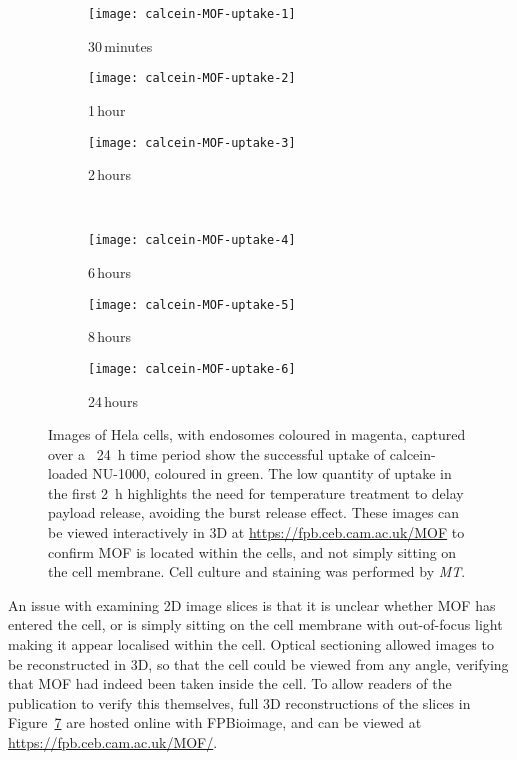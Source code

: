 \begin{figure}[tbp]
\centering
\begin{subfigure}[b]{0.325\textwidth}
	\texttt{[image: calcein-MOF-uptake-1]}
	\caption{30\,minutes}\label{fig:calcein-MOF-uptake-1}
\end{subfigure}
\hfill
\begin{subfigure}[b]{0.325\textwidth}
	\texttt{[image: calcein-MOF-uptake-2]}
	\caption{1\,hour}\label{fig:calcein-MOF-uptake-2}
\end{subfigure}
\hfill
\begin{subfigure}[b]{0.325\textwidth}
	\texttt{[image: calcein-MOF-uptake-3]}
	\caption{2\,hours}\label{fig:calcein-MOF-uptake-3}
\end{subfigure}

~\newline
\begin{subfigure}[b]{0.325\textwidth}
	\texttt{[image: calcein-MOF-uptake-4]}
	\caption{6\,hours}\label{fig:calcein-MOF-uptake-4}
\end{subfigure}
\hfill
\begin{subfigure}[b]{0.325\textwidth}
	\texttt{[image: calcein-MOF-uptake-5]}
	\caption{8\,hours}\label{fig:calcein-MOF-uptake-5}
\end{subfigure}
\hfill
\begin{subfigure}[b]{0.325\textwidth}
	\texttt{[image: calcein-MOF-uptake-6]}
	\caption{24\,hours}\label{fig:calcein-MOF-uptake-6}
\end{subfigure}
\caption[MOFs: Calcein-loaded NU-1000 is taken up by cells over a \SI{24}{\hour} period]{Images of Hela cells, with endosomes coloured in magenta, captured over a ~\SI{24}{\hour} time period show the successful uptake of calcein-loaded NU-1000, coloured in green. The low quantity of uptake in the first \SI{2}{\hour} highlights the need for temperature treatment to delay payload release, avoiding the burst release effect. These images can be viewed interactively in 3D at \url{https://fpb.ceb.cam.ac.uk/MOF} to confirm MOF is located within the cells, and not simply sitting on the cell membrane. Cell culture and staining was performed by \textit{MT}. }
\label{fig:calcein-MOF-uptake}
\end{figure}

An issue with examining 2D image slices is that it is unclear whether MOF has entered the cell, or is simply sitting on the cell membrane with out-of-focus light making it appear localised within the cell. 
Optical sectioning allowed images to be reconstructed in 3D, so that the cell could be viewed from any angle, verifying that MOF had indeed been taken inside the cell. 
To allow readers of the publication to verify this themselves, full 3D reconstructions of the slices in Figure~\ref{fig:calcein-MOF-uptake} are hosted online with FPBioimage, and can be viewed at \url{https://fpb.ceb.cam.ac.uk/MOF/}. 

